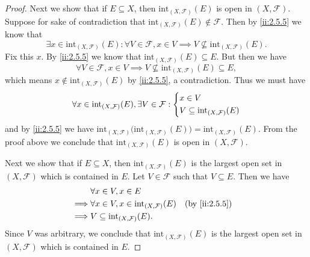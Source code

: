\begin{proof}
  Next we show that if \(E \subseteq X\), then \(\text{int}_{(X, \mathcal{F})}(E)\) is open in \((X, \mathcal{F})\).
  Suppose for sake of contradiction that \(\text{int}_{(X, \mathcal{F})}(E) \notin \mathcal{F}\).
  Then by \cref{ii:2.5.5} we know that
  \[
    \exists x \in \text{int}_{(X, \mathcal{F})}(E) : \forall V \in \mathcal{F}, x \in V \implies V \not\subseteq \text{int}_{(X, \mathcal{F})}(E).
  \]
  Fix this \(x\).
  By \cref{ii:2.5.5} we know that \(\text{int}_{(X, \mathcal{F})}(E) \subseteq E\).
  But then we have
  \[
    \forall V \in \mathcal{F}, x \in V \implies V \not\subseteq \text{int}_{(X, \mathcal{F})}(E) \subseteq E,
  \]
  which means \(x \notin \text{int}_{(X, \mathcal{F})}(E)\) by \cref{ii:2.5.5}, a contradiction.
  Thus we must have
  \[
    \forall x \in \text{int}_{(X, \mathcal{F})}(E), \exists V \in \mathcal{F} : \begin{dcases}
      x \in V \\
      V \subseteq \text{int}_{(X, \mathcal{F})}(E)
    \end{dcases}
  \]
  and by \cref{ii:2.5.5} we have \(\text{int}_{(X, \mathcal{F})}\big(\text{int}_{(X, \mathcal{F})}(E)\big) = \text{int}_{(X, \mathcal{F})}(E)\).
  From the proof above we conclude that \(\text{int}_{(X, \mathcal{F})}(E)\) is open in \((X, \mathcal{F})\).

  Next we show that if \(E \subseteq X\), then \(\text{int}_{(X, \mathcal{F})}(E)\) is the largest open set in \((X, \mathcal{F})\) which is contained in \(E\).
  Let \(V \in \mathcal{F}\) such that \(V \subseteq E\).
  Then we have
  \begin{align*}
             & \forall x \in V, x \in E                                                   \\
    \implies & \forall x \in V, x \in \text{int}_{(X, \mathcal{F})}(E) &  & \by{ii:2.5.5} \\
    \implies & V \subseteq \text{int}_{(X, \mathcal{F})}(E).
  \end{align*}
  Since \(V\) was arbitrary, we conclude that \(\text{int}_{(X, \mathcal{F})}(E)\) is the largest open set in \((X, \mathcal{F})\) which is contained in \(E\).


\end{proof}
